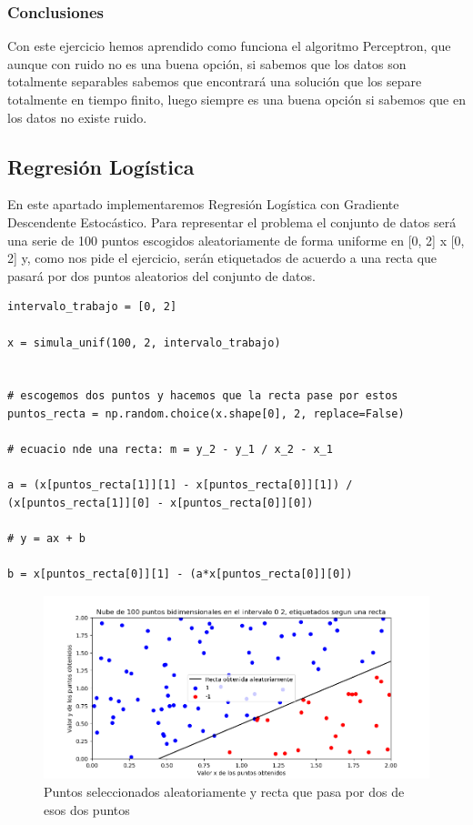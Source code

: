 \documentclass[12pt, spanish]{article}
\begin{document}
\subsubsection{Conclusiones}

Con este ejercicio hemos aprendido como funciona el algoritmo Perceptron, que aunque con ruido no es una buena opción, si sabemos que los datos son totalmente separables sabemos que encontrará una solución que los separe totalmente en tiempo finito, luego siempre es una buena opción si sabemos que en los datos no existe ruido.


\newpage

\subsection{Regresión Logística}

En este apartado implementaremos Regresión Logística con Gradiente Descendente Estocástico. Para representar el problema el conjunto de datos será una serie de 100 puntos escogidos aleatoriamente de forma uniforme en [0, 2] x [0, 2] y, como nos pide el ejercicio, serán etiquetados de acuerdo a una recta que pasará por dos puntos aleatorios del conjunto de datos.

\begin{lstlisting}
intervalo_trabajo = [0, 2]

x = simula_unif(100, 2, intervalo_trabajo)


# escogemos dos puntos y hacemos que la recta pase por estos
puntos_recta = np.random.choice(x.shape[0], 2, replace=False)

# ecuacio nde una recta: m = y_2 - y_1 / x_2 - x_1

a = (x[puntos_recta[1]][1] - x[puntos_recta[0]][1]) / (x[puntos_recta[1]][0] - x[puntos_recta[0]][0])

# y = ax + b

b = x[puntos_recta[0]][1] - (a*x[puntos_recta[0]][0])
\end{lstlisting}

\begin{figure}[H]
  \centering
      \includegraphics[scale = 0.70]{ej-2-puntos.png}
 		 \caption{Puntos seleccionados aleatoriamente y recta que pasa por dos de esos dos puntos}
  		\label{fig:ej2-puntos}

\end{figure}
\end{document}
